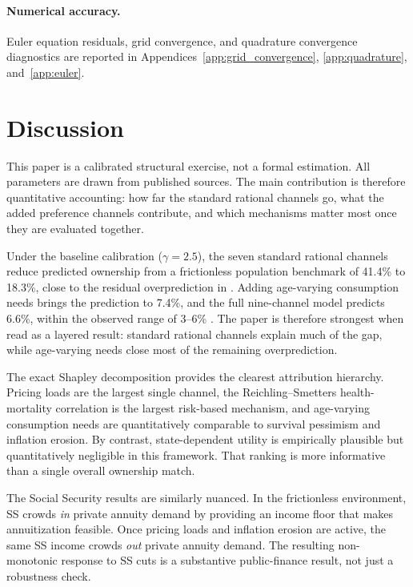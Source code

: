\documentclass[12pt]{article}
\begin{document}
\paragraph{Numerical accuracy.} Euler equation residuals, grid convergence, and quadrature convergence diagnostics are reported in Appendices~\ref{app:grid_convergence}, \ref{app:quadrature}, and~\ref{app:euler}.


\section{Discussion}
\label{sec:discussion}

This paper is a calibrated structural exercise, not a formal estimation. All parameters are drawn from published sources. The main contribution is therefore quantitative accounting: how far the standard rational channels go, what the added preference channels contribute, and which mechanisms matter most once they are evaluated together.

Under the baseline calibration ($\gamma = 2.5$), the seven standard rational channels reduce predicted ownership from a frictionless population benchmark of 41.4\% to 18.3\%, close to the residual overprediction in \citet{pashchenko2013}. Adding age-varying consumption needs brings the prediction to 7.4\%, and the full nine-channel model predicts 6.6\%, within the observed range of 3--6\% \citep{lockwood2012, dushiwebb2004}. The paper is therefore strongest when read as a layered result: standard rational channels explain much of the gap, while age-varying needs close most of the remaining overprediction.

The exact Shapley decomposition provides the clearest attribution hierarchy. Pricing loads are the largest single channel, the Reichling--Smetters health-mortality correlation is the largest risk-based mechanism, and age-varying consumption needs are quantitatively comparable to survival pessimism and inflation erosion. By contrast, state-dependent utility is empirically plausible but quantitatively negligible in this framework. That ranking is more informative than a single overall ownership match.

The Social Security results are similarly nuanced. In the frictionless environment, SS crowds \emph{in} private annuity demand by providing an income floor that makes annuitization feasible. Once pricing loads and inflation erosion are active, the same SS income crowds \emph{out} private annuity demand. The resulting non-monotonic response to SS cuts is a substantive public-finance result, not just a robustness check.
\end{document}
